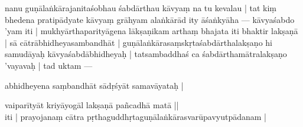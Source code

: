 \documentclass[14pt]{extarticle}
\begin{document}
\pstart
 nanu guṇālaṅkārajanitaśobhau śabdārthau kāvyaṃ na tu kevalau | tat kiṃ bhedena pratipādyate kāvyaṃ grāhyam alaṅkārād ity āśaṅkyāha — kāvyaśabdo ’yam iti | mukhyārthaparityāgena lākṣaṇikam arthaṃ bhajata iti bhaktir lakṣaṇā | sā cātrābhidheyasambandhāt | guṇālaṅkārasaṃskṛtaśabdārthalakṣaṇo hi samudāyaḥ kāvyaśabdābhidheyaḥ | tatsambaddhaś ca śabdārthamātralakṣaṇo ’vayavaḥ | tad uktam — 


    abhidheyena saṃbandhāt sādṛśyāt samavāyataḥ | 

\smallskip
vaiparītyāt kriyāyogāl lakṣaṇā pañcadhā matā || \\
iti | prayojanaṃ cātra pṛthaguddhṛtaguṇālaṅkārasvarūpavyutpādanam | 
\pend



\endnumbering
\endgroup
\end{document}
